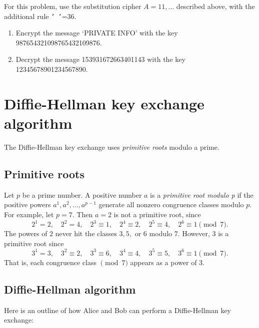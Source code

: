 \begin{problem}
For this problem, use the substitution cipher $A=11, \ldots$ described above, with the additional rule \texttt{' '}=36.
\begin{enumerate}
\item Encrypt the message `PRIVATE INFO' with the key 987654321098765432109876.
\item Decrypt the message 153931672663401143 with the key 12345678901234567890.
\end{enumerate}
\end{problem}



\section*{Diffie-Hellman key exchange algorithm}
The Diffie-Hellman key exchange uses \emph{primitive roots} modulo a prime.

\subsection*{Primitive roots}
Let $p$ be a prime number. 
A positive number $a$ is a \emph{primitive root modulo p} if the positive powers $a^1, a^2, \ldots, a^{p-1}$ generate all nonzero congruence classes modulo $p$.
For example, let $p=7$.
Then $a=2$ is not a primitive root, since
\[
2^1=2, \quad 2^2=4, \quad 2^3 \equiv 1, \quad 2^4 \equiv 2, \quad 2^5 \equiv 4, \quad 2^6 \equiv 1 \pmod{7}.
\]
The powers of $2$ never hit the classes $3, 5,$ or $6$ modulo 7. 
However, $3$ is a primitive root since
\[
3^1=3, \quad 3^2\equiv2, \quad 3^3 \equiv 6, \quad 3^4 \equiv 4, \quad 3^5 \equiv 5, \quad 3^6 \equiv 1 \pmod{7}.
\]
That is, each congruence class $\pmod{7}$ appears as a power of 3.

\subsection*{Diffie-Hellman algorithm}

Here is an outline of how Alice and Bob can perform a Diffie-Hellman key exchange:


